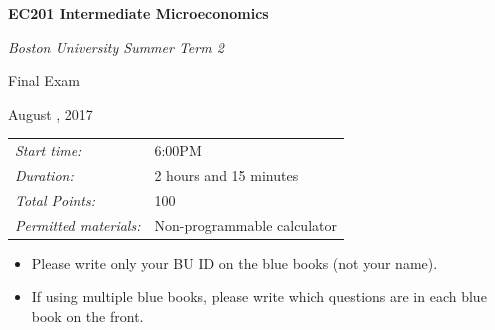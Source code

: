 \documentclass[11pt]{article}
\newcounter{question}[section]
\begin{document}
\thispagestyle{empty}
\vspace*{0.12\paperheight}
\begin{center}

  \Huge{\bf EC201 Intermediate Microeconomics}
  \bigskip

  \large{\sl Boston University Summer Term 2}

  \bigskip
  \bigskip
  \Huge{\sc Final Exam}

  \bigskip

  \bigskip
  \bigskip
  \bigskip

  \Large{\sc August , 2017}

  \bigskip
  \bigskip
  \bigskip
  \bigskip

  \begin{tabular}{ll}
    \emph{Start time:} & 6:00PM \\
    \emph{Duration:} & 2 hours and 15 minutes\\
    \emph{Total Points:} & 100 \\
    \emph{Permitted materials:} & Non-programmable calculator \\
  \end{tabular}
  \bigskip
  \bigskip
  \bigskip
  \par
  \begin{itemize}
    \item Please write only your BU ID on the blue books (not your name).
    \item If using multiple blue books, please write which questions are in each blue book on the front.
  \end{itemize}


\end{center}
\end{document}
